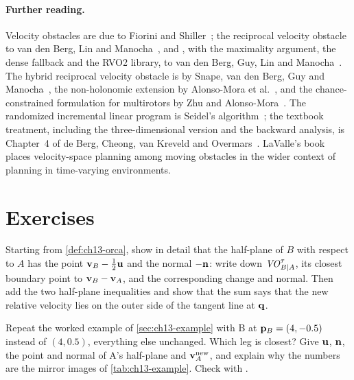 \paragraph{Further reading.}
Velocity obstacles are due to Fiorini and Shiller~\cite{fiorini1998motion};
the reciprocal velocity obstacle to van den Berg, Lin and
Manocha~\cite{vandenberg2008rvo}, and \orca, with the maximality argument, the
dense fallback and the RVO2 library, to van den Berg, Guy, Lin and
Manocha~\cite{vandenberg2011orca}. The hybrid reciprocal velocity obstacle
is by Snape, van den Berg, Guy and Manocha~\cite{snape2011hrvo}, the
non-holonomic extension by Alonso-Mora et al.~\cite{alonsomora2013optimal},
and the chance-constrained formulation for multirotors by Zhu and
Alonso-Mora~\cite{zhu2019chance}. The randomized incremental linear program
is Seidel's algorithm~\cite{seidel1991small}; the textbook treatment,
including the three-dimensional version and the backward analysis, is
Chapter~4 of de Berg, Cheong, van Kreveld and
Overmars~\cite{deberg2008computational}. LaValle's
book~\cite{lavalle2006planning} places velocity-space planning among
moving obstacles in the wider context of planning in time-varying
environments.

\section{Exercises}
\label{sec:ch13-exercises}

\begin{exercise}[\difficulty{1}]
\label{exr:ch13-mirror}
Starting from \cref{def:ch13-orca}, show in detail that the half-plane of $B$
with respect to $A$ has the point $\mathbf{v}_B - \tfrac12\mathbf{u}$ and the normal
$-\mathbf{n}$: write down $\mathit{VO}^{\tau}_{B|A}$, its closest boundary point to
$\mathbf{v}_B - \mathbf{v}_A$, and the corresponding change and normal. Then add the two
half-plane inequalities and show that the sum says that the new relative
velocity lies on the outer side of the tangent line at $\mathbf{q}$.
\end{exercise}

\begin{exercise}[\difficulty{1}]
\label{exr:ch13-by-hand}
Repeat the worked example of \cref{sec:ch13-example} with B at
$\mathbf{p}_B = (4, -0.5)$ instead of $(4, 0.5)$, everything else unchanged. Which
leg is closest? Give $\mathbf{u}$, $\mathbf{n}$, the point and normal of A's
half-plane and $\mathbf{v}_A^{\mathrm{new}}$, and explain why the numbers are the
mirror images of \cref{tab:ch13-example}. Check with
.
\end{exercise}

